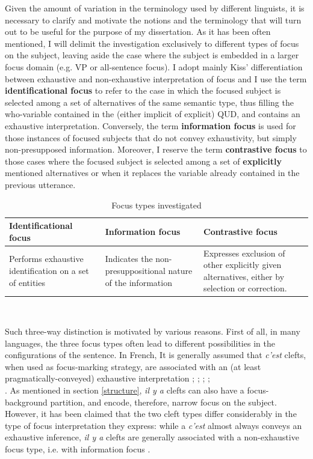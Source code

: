 \documentclass[12pt]{report}
\begin{document}
Given the amount of variation in the terminology used by different linguists, it is necessary to clarify and motivate the notions and the terminology that will turn out to be useful for the purpose of my dissertation. As it has been often mentioned, I will delimit the investigation exclusively to different types of focus on the subject, leaving aside the case where the subject is embedded in a larger focus domain (e.g. VP or all-sentence focus).
I adopt mainly Kiss' differentiation between exhaustive and non-exhaustive interpretation of focus \cite{kiss1998identificational} and I use the term \textbf{identificational focus} to refer to the case in which the focused subject is selected among a set of alternatives of the same semantic type, thus filling the who-variable contained  in the (either implicit of explicit) QUD, and contains an exhaustive interpretation. Conversely, the term \textbf{information focus} is used for those instances of focused subjects that do not convey exhaustivity, but simply non-presupposed information.
Moreover, I reserve the term \textbf{contrastive focus} to those cases where the focused subject is selected among a set of \textbf{explicitly} mentioned alternatives or when it replaces the variable already contained in the previous utterance.\\
\begin{table}[h!]
\begin{center}
\begin{tabular}{ |p{4.5cm}|p{4.5cm}|p{4.5cm}|  }
 \hline
\textbf{Identificational focus} & \textbf{Information focus} & \textbf{Contrastive focus}\\
 \hline
 \small Performs exhaustive identification on a set of entities & \small Indicates the non-presuppositional nature of the information & \small Expresses exclusion of other explicitly given alternatives, either by selection or correction.\\ 
 \hline
\end{tabular}\\
\end{center}
\caption{Focus types investigated}
\label{Table1}
\end{table}


\noindent
Such three-way distinction is motivated by various reasons. First of all, in many languages, the three focus types often lead to different possibilities in the configurations of the sentence. In French, It is generally assumed that \textit{c'est} clefts, when used as focus-marking strategy, are associated with an (at least pragmatically-conveyed) exhaustive interpretation \cite{horn1981exhaustiveness}; \cite{kiss1998identificational}; \cite{drenhaus2011exhaustiveness}; \cite{destruel2012french};\\
\noindent
\cite{de2015status}. As mentioned in section \ref{structure}, \textit{il y a} clefts can also have a focus-background partition, and encode, therefore, narrow focus on the subject. However, it has been claimed that the two cleft types differ considerably in the type of focus interpretation they express: while a \textit{c'est} almost always conveys an exhaustive inference, \textit{il y a} clefts are generally associated with a non-exhaustive focus type, i.e. with information focus \cite{karssenberg2017oiseaux}.
\end{document}
